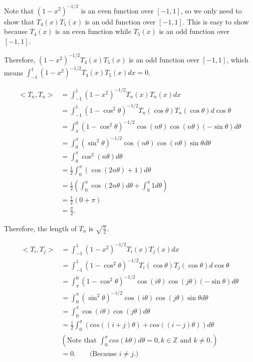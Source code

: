 \documentclass[
  course = {{16-811 Math Fundamentals for Robotics}},
  quartile = {{1}},
  assignment = 3,
  name = {{Kangle Deng}},
  email = {{kangled@andrew.cmu.edu}},
  firstexercise = 1
]{aga-homework}
\begin{document}
\subexercise
Note that $(1-x^2)^{-1/2}$ is an even function over $[-1,1]$, so we only need to show that $T_4(x)T_5(x)$ is an odd function over $[-1,1]$. This is easy to show because $T_4(x)$ is an even function while $T_5(x)$ is an odd function over $[-1,1]$.

Therefore, $(1-x^2)^{-1/2}T_4(x)T_5(x)$ is an odd function over $[-1,1]$, which means $\int_{-1}^1(1-x^2)^{-1/2}T_4(x)T_5(x)dx=0$.

\subexercise
\begin{equation*}
    \begin{aligned}
        <T_n,T_n> & = \int_{-1}^1(1-x^2)^{-1/2}T_n(x)T_n(x)dx \\
        & = \int_{-1}^1(1-\cos^2 \theta)^{-1/2}T_n(\cos \theta)T_n(\cos \theta)d\cos \theta \\
        & = \int_{\pi}^0(1-\cos^2 \theta)^{-1/2}\cos (n\theta)\cos (n\theta)(-\sin \theta) d\theta \\
        & = \int_{0}^{\pi}(\sin^2 \theta)^{-1/2}\cos (n\theta)\cos (n\theta)\sin \theta d\theta \\
        & = \int_{0}^{\pi}\cos^2 (n\theta) d\theta \\
        & = \frac{1}{2} \int_{0}^{\pi}(\cos (2n\theta) + 1) d\theta \\
        & = \frac{1}{2} (\int_{0}^{\pi}\cos (2n\theta)d \theta + \int_{0}^{\pi}1 d \theta)  \\
        & = \frac{1}{2} (0 + \pi)  \\
        & = \frac{\pi}{2}.
    \end{aligned}
\end{equation*}

Therefore, the length of $T_n$ is $\sqrt{\frac{\pi}{2}}$.

\subexercise
\begin{equation*}
    \begin{aligned}
        <T_i,T_j> & = \int_{-1}^1(1-x^2)^{-1/2}T_i(x)T_j(x)dx \\
        & = \int_{-1}^1(1-\cos^2 \theta)^{-1/2}T_i(\cos \theta)T_j(\cos \theta)d\cos \theta \\
        & = \int_{\pi}^0(1-\cos^2 \theta)^{-1/2}\cos(i \theta)\cos(j \theta) (-\sin \theta) d \theta \\
        & = \int_{0}^{\pi}(\sin^2 \theta)^{-1/2}\cos(i \theta)\cos(j \theta) \sin \theta d \theta \\
        & = \int_{0}^{\pi}\cos(i \theta)\cos(j \theta)d \theta \\
        & = \frac{1}{2}\int_{0}^{\pi}(cos((i+j)\theta) + cos((i-j)\theta))d \theta \\
        & (\text{Note that $\int_{0}^{\pi}cos(k\theta)d\theta = 0, k \in \mathbb{Z}$ and $k \ne 0$.}) \\
        & = 0. \qquad \text{(Because $i \ne j$.)}
    \end{aligned}
\end{equation*}
\end{document}
